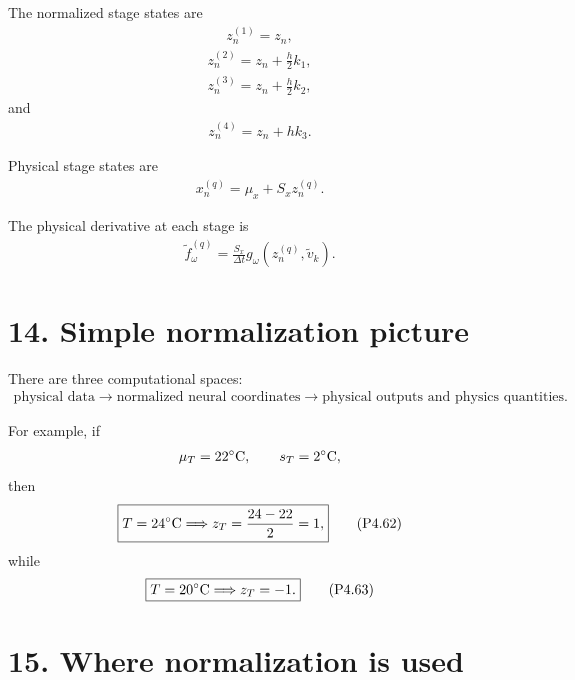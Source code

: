 \documentclass[11pt]{article}
\begin{document}
The normalized stage states are
\begin{align}
\boxed{z_n^{(1)}=z_n,}
\tag{P4.55}
\end{align}
\begin{align}
\boxed{z_n^{(2)}=z_n+\frac{h}{2}k_1,}
\tag{P4.56}
\end{align}
\begin{align}
\boxed{z_n^{(3)}=z_n+\frac{h}{2}k_2,}
\tag{P4.57}
\end{align}
and
\begin{align}
\boxed{z_n^{(4)}=z_n+hk_3.}
\tag{P4.58}
\end{align}

Physical stage states are
\begin{align}
\boxed{
x_n^{(q)}
=
\mu_x+S_xz_n^{(q)}.
}
\tag{P4.59}
\end{align}

The physical derivative at each stage is
\begin{align}
\boxed{
\widetilde f_\omega^{(q)}
=
\frac{S_x}{\Delta t}
g_\omega(z_n^{(q)},\widetilde v_k).
}
\tag{P4.60}
\end{align}

\section*{14. Simple normalization picture}

There are three computational spaces:
\begin{align}
\boxed{
\text{physical data}
\rightarrow
\text{normalized neural coordinates}
\rightarrow
\text{physical outputs and physics quantities}.
}
\tag{P4.61}
\end{align}

For example, if
\begin{align}
\mu_T=22^\circ{\rm C},
\qquad
s_T=2^\circ{\rm C},
\end{align}
then
\begin{align}
\boxed{
T=24^\circ{\rm C}
\Longrightarrow
z_T=\frac{24-22}{2}=1,
}
\tag{P4.62}
\end{align}
while
\begin{align}
\boxed{
T=20^\circ{\rm C}
\Longrightarrow
z_T=-1.
}
\tag{P4.63}
\end{align}

\section*{15. Where normalization is used}
\end{document}
